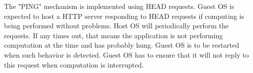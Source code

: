 The "PING" mechanism is implemented using HEAD requests. Guest OS is expected to host a HTTP server responding to HEAD requests if computing is being performed without problems. Host OS will periodically perform the requests. If any times out, that means the application is not performing computation at the time and has probably hung. Guest OS is to be restarted when such behavior is detected. Guest OS has to ensure that it will not reply to this request when computation is interrupted.
